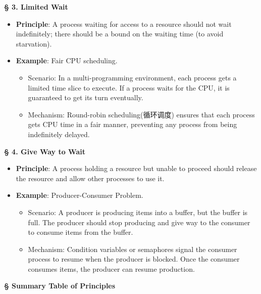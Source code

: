 \documentclass[a4paper]{book}
\newcommand{\sfbf}[1]{{\normalsize\textsf{\textbf{§ #1}}}}
\begin{document}
\sfbf{3. Limited Wait}

\begin{itemize}
\item 
\textbf{Principle}: A process waiting for access to a resource should not wait indefinitely; there should be a bound on the waiting time (to avoid starvation).

\item 
\textbf{Example}: Fair CPU scheduling.
\begin{itemize}
\item 
Scenario: In a multi-programming environment, each process gets a limited time slice to execute. If a process waits for the CPU, it is guaranteed to get its turn eventually.

\item 
Mechanism: Round-robin scheduling(循环调度) ensures that each process gets CPU time in a fair manner, preventing any process from being indefinitely delayed.

\end{itemize}

\end{itemize}

\sfbf{4. Give Way to Wait}

\begin{itemize}
\item 
\textbf{Principle}: A process holding a resource but unable to proceed should release the resource and allow other processes to use it.

\item 
\textbf{Example}: Producer-Consumer Problem.
\begin{itemize}
\item 
Scenario: A producer is producing items into a buffer, but the buffer is full. The producer should stop producing and give way to the consumer to consume items from the buffer.

\item 
Mechanism: Condition variables or semaphores signal the consumer process to resume when the producer is blocked. Once the consumer consumes items, the producer can resume production.

\end{itemize}

\end{itemize}

\sfbf{Summary Table of Principles}
\end{document}
